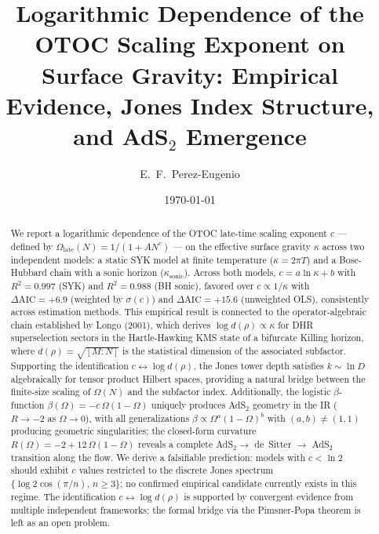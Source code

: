 \documentclass[aps,prl,twocolumn,superscriptaddress,showpacs]{revtex4-2}
\newcommand{\late}{\mathrm{late}}
\begin{document}
\title{Logarithmic Dependence of the OTOC Scaling Exponent on Surface Gravity:
       Empirical Evidence, Jones Index Structure, and AdS$_2$ Emergence}

\author{E.~F.~Perez-Eugenio}

\date{\today}

\begin{abstract}
We report a logarithmic dependence of the OTOC late-time scaling exponent $c$
--- defined by $\Omega_\late(N) = 1/(1+AN^c)$ --- on the effective surface
gravity $\kappa$ across two independent models: a static SYK model at finite
temperature ($\kappa = 2\pi T$) and a Bose-Hubbard chain with a sonic horizon
($\kappa_\mathrm{sonic}$). Across both models, $c = a\ln\kappa + b$ with
$R^2 = 0.997$ (SYK) and $R^2 = 0.988$ (BH sonic), favored over
$c \propto 1/\kappa$ with $\Delta\mathrm{AIC} = +6.9$ (weighted by
$\sigma(c)$) and $\Delta\mathrm{AIC} = +15.6$ (unweighted OLS),
consistently across estimation methods. This empirical result is connected to the
operator-algebraic chain established by Longo (2001), which derives
$\log d(\rho) \propto \kappa$ for DHR superselection sectors in the
Hartle-Hawking KMS state of a bifurcate Killing horizon, where
$d(\rho) = \sqrt{[M:N]}$ is the statistical dimension of the associated
subfactor. Supporting the identification $c \leftrightarrow \log d(\rho)$,
the Jones tower depth satisfies $k \sim \ln D$ algebraically for tensor
product Hilbert spaces, providing a natural bridge between the finite-size
scaling of $\Omega(N)$ and the subfactor index. Additionally, the logistic
$\beta$-function $\beta(\Omega) = -c\,\Omega(1-\Omega)$ uniquely produces
AdS$_2$ geometry in the IR ($R \to -2$ as $\Omega \to 0$), with all
generalizations $\beta \propto \Omega^a(1-\Omega)^b$ with
$(a,b)\neq(1,1)$ producing geometric singularities; the closed-form
curvature $R(\Omega) = -2 + 12\,\Omega(1-\Omega)$ reveals a complete
AdS$_2 \to$ de~Sitter $\to$ AdS$_2$ transition along the flow. We derive
a falsifiable prediction: models with $c < \ln 2$ should exhibit $c$
values restricted to the discrete Jones spectrum
$\{\log 2\cos(\pi/n),\, n \geq 3\}$; no confirmed empirical candidate
currently exists in this regime. The identification
$c \leftrightarrow \log d(\rho)$ is supported by convergent evidence from
multiple independent frameworks; the formal bridge via the Pimsner-Popa
theorem is left as an open problem.
\end{abstract}
\end{document}
